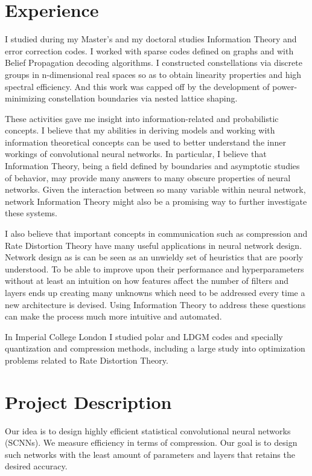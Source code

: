 \documentclass[12pt, a4paper]{article}
\begin{document}
\section*{Experience}

I studied during my Master’s and my doctoral studies Information Theory and error correction codes. I worked with sparse codes defined on graphs and with Belief Propagation decoding algorithms.  I constructed constellations via discrete groups in n-dimensional real spaces so as to obtain linearity properties and high spectral efficiency. And this work was capped off by the development of power-minimizing constellation boundaries via nested lattice shaping. 

These activities gave me insight into information-related and probabilistic concepts. I believe that my abilities in deriving models and working with information theoretical concepts can be used to better understand the inner workings of convolutional neural networks. In particular, I believe that Information Theory, being a field defined by boundaries and asymptotic studies of behavior, may provide many answers to many obscure properties of neural networks. Given the interaction between so many variable within neural network, network Information Theory might also be a promising way to further investigate these systems.

I also believe that important concepts in communication such as compression and Rate Distortion Theory have many useful applications in neural network design. Network design as is can be seen as an unwieldy set of heuristics that are poorly understood. To be able to improve upon their performance and hyperparameters without at least an intuition on how features affect the number of filters and layers ends up creating many unknowns which need to be addressed every time a new architecture is devised. Using Information Theory to address these questions can make the process much more intuitive and automated.

In Imperial College London I studied polar and LDGM codes and specially quantization and compression methods, including a large study into optimization problems related to Rate Distortion Theory.

\section*{Project Description}

Our idea is to design highly efficient statistical convolutional neural networks (SCNNs). We measure efficiency in terms of compression. Our goal is to design such networks with the least amount of parameters and layers that retains the desired accuracy.
\end{document}
